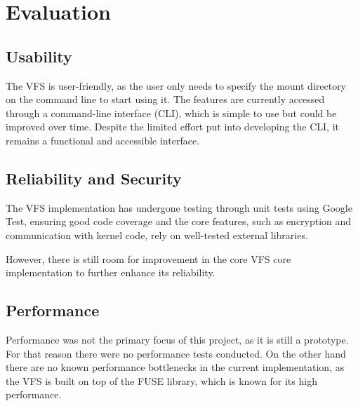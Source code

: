 \section{Evaluation}\label{sec:evaluation}


\subsection{Usability}\label{subsec:usability}

The VFS is user-friendly, as the user only needs to specify the mount directory on the command line to start using it.
The features are currently accessed through a command-line interface (CLI), which is simple to use but could be improved over time.
Despite the limited effort put into developing the CLI, it remains a functional and accessible interface.

\subsection{Reliability and Security}\label{subsec:reliability-and-security}

The VFS implementation has undergone testing through unit tests using Google Test, ensuring good code coverage and the core features, such as encryption and communication with kernel code, rely on well-tested external libraries.

However, there is still room for improvement in the core VFS core implementation to further enhance its reliability.

\subsection{Performance}\label{subsec:performance}

Performance was not the primary focus of this project, as it is still a prototype.
For that reason there were no performance tests conducted.
On the other hand there are no known performance bottlenecks in the current implementation, as the VFS is built on top of the FUSE library, which is known for its high performance.
